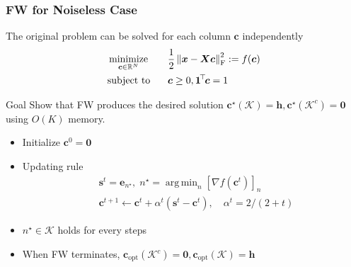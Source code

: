 \documentclass[10pt,xcolor={usenames,dvipsnames,table}]{beamer}
\newcommand{\norm}[1]{\left\lVert#1\right\rVert}
\newcommand{\T}{\!\top\!}
\DeclareMathOperator*{\argmin}{arg\,min}
\DeclareMathOperator*{\minimize}{minimize}
\begin{document}
\begin{frame}[label=fine]
    \frametitle{FW for Noiseless Case}
The original problem can be solved for each column $\bm{c}$ independently
    \begin{alignat*}{2}
        & \minimize_{\bm{c} \in \mathbb{R}^{N}} \quad && \dfrac{1}{2} \norm{\bm{x} - \bm{X}\bm{c}}_{\rm F}^2 := f(\bm{c}) \\
        & \text{\rm subject to} && \bm{c} \geq 0, \bm{1}^{\T}\bm{c} = 1
    \end{alignat*}
    \begin{block}{Goal}
        Show that FW produces the desired solution $\bm{c}^{\star}(\mathcal{K}) = \bm{h}, \bm{c}^{\star}(\mathcal{K}^{c})= \bm{0}$ using $O(K)$ memory.
    \end{block}

    \begin{itemize}
    \item Initialize $\bm{c}^{0} =\bm{0}$
    \item  Updating rule
        \begin{align*}
        &\bm{s}^{t} = \bm{e}_{n^{\star}}, \; n^{\star} = \argmin_{n} [\nabla f(\bm{c}^{t})]_n \\
        &\bm{c}^{t+1} \leftarrow \bm{c}^{t} + \alpha^{t} (\bm{s}^{t} - \bm{c}^{t}) , \quad \alpha^{t}=2/(2+t)
        \end{align*}
    \item $n^{\star} \in \mathcal{K}$ holds for every steps
    \item When FW terminates, $\bm{c}_{\text{opt}}(\mathcal{K}^{c}) = \bm{0}, \bm{c}_\text{opt}(\mathcal{K}) = \bm{h}$
    \end{itemize}
\end{frame}
\end{document}
